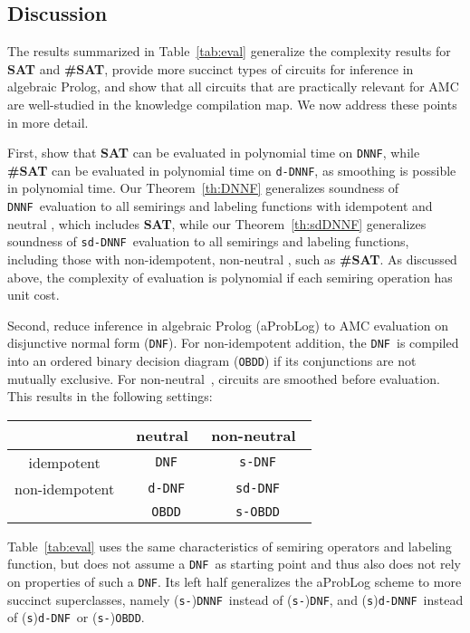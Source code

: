 \documentclass{article}
\theoremstyle{plain}
\theoremstyle{definition}
\newcommand{\DNF}{{\tt DNF}}
\newcommand{\dDNF}{{\tt d-DNF}}
\newcommand{\sDNF}{{\tt s-DNF}}
\newcommand{\sdDNF}{{\tt sd-DNF}}
\newcommand{\DNNF}{{\tt DNNF}}
\newcommand{\dDNNF}{{\tt d-DNNF}}
\newcommand{\sdDNNF}{{\tt sd-DNNF}}
\newcommand{\OBDD}{{\tt OBDD}}
\newcommand{\sOBDD}{{\tt s-OBDD}}
\begin{document}
\subsection{Discussion}\label{sec:related} 
The results summarized in Table~\ref{tab:eval} generalize the
complexity results for \textbf{SAT} and \textbf{\#SAT}, provide more succinct types of
circuits for inference in algebraic Prolog, and show
that all circuits that are practically relevant for AMC are
well-studied in the knowledge compilation map. We now address these
points in more detail.  

First, \citet{darwiche2002knowledge} show that \textbf{SAT} can be
evaluated in polynomial time on \DNNF, while \textbf{\#SAT} can be evaluated
in polynomial time on \dDNNF, as smoothing is possible in polynomial
time. 
Our Theorem~\ref{th:DNNF} generalizes
soundness of \DNNF\ evaluation to all semirings and labeling functions
with idempotent and neutral , which includes
\textbf{SAT}, while 
our Theorem~\ref{th:sdDNNF} generalizes soundness of \sdDNNF\ evaluation
to all semirings and labeling functions, including those with non-idempotent, non-neutral ,
such as \textbf{\#SAT}. 
As discussed above, the complexity of evaluation is polynomial if each 
semiring operation has unit cost.


Second, \citet{Kimmig11} reduce 
 inference in algebraic Prolog (aProbLog) to AMC evaluation on 
disjunctive normal form
(\DNF). For non-idempotent addition, the \DNF\ is compiled into an  ordered binary decision diagram
(\OBDD) if its conjunctions are not mutually exclusive. For non-neutral~, circuits
are smoothed before evaluation. 
This results  in the following settings:  

\begin{center}
\begin{tabular}{|c|c|c|}
\hline
& neutral~ & non-neutral~  \\\hline
idempotent~ & \DNF & \sDNF \\\hline
non-idempotent~ & \dDNF & \sdDNF\\
 & \OBDD & \sOBDD  \\\hline
\end{tabular}
\end{center}
Table~\ref{tab:eval} uses the same characteristics of semiring operators and labeling
function, but does not assume a \DNF\ as starting point and thus also
does not rely on properties of such a \DNF. Its left half generalizes
the aProbLog scheme to more succinct superclasses, namely (\texttt{s-})\DNNF\ instead of (\texttt{s-})\DNF,
and (\texttt{s})\dDNNF\ instead of (\texttt{s})\dDNF\ or (\texttt{s-})\OBDD.
\end{document}
